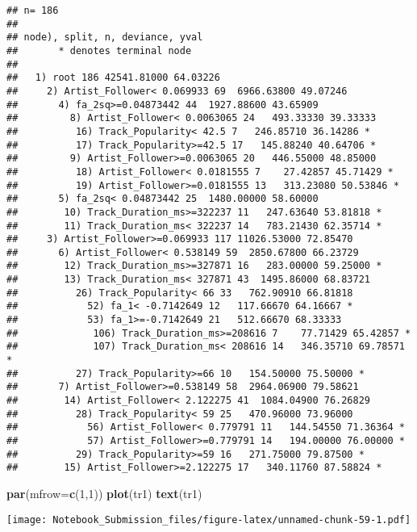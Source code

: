 \documentclass[
]{article}
\newenvironment{Shaded}{\begin{snugshade}}{\end{snugshade}}
\newcommand{\DataTypeTok}[1]{\textcolor[rgb]{0.13,0.29,0.53}{#1}}
\newcommand{\DecValTok}[1]{\textcolor[rgb]{0.00,0.00,0.81}{#1}}
\newcommand{\KeywordTok}[1]{\textcolor[rgb]{0.13,0.29,0.53}{\textbf{#1}}}
\newcommand{\NormalTok}[1]{#1}
\begin{document}
\begin{verbatim}
## n= 186 
## 
## node), split, n, deviance, yval
##       * denotes terminal node
## 
##   1) root 186 42541.81000 64.03226  
##     2) Artist_Follower< 0.069933 69  6966.63800 49.07246  
##       4) fa_2sq>=0.04873442 44  1927.88600 43.65909  
##         8) Artist_Follower< 0.0063065 24   493.33330 39.33333  
##          16) Track_Popularity< 42.5 7   246.85710 36.14286 *
##          17) Track_Popularity>=42.5 17   145.88240 40.64706 *
##         9) Artist_Follower>=0.0063065 20   446.55000 48.85000  
##          18) Artist_Follower< 0.0181555 7    27.42857 45.71429 *
##          19) Artist_Follower>=0.0181555 13   313.23080 50.53846 *
##       5) fa_2sq< 0.04873442 25  1480.00000 58.60000  
##        10) Track_Duration_ms>=322237 11   247.63640 53.81818 *
##        11) Track_Duration_ms< 322237 14   783.21430 62.35714 *
##     3) Artist_Follower>=0.069933 117 11026.53000 72.85470  
##       6) Artist_Follower< 0.538149 59  2850.67800 66.23729  
##        12) Track_Duration_ms>=327871 16   283.00000 59.25000 *
##        13) Track_Duration_ms< 327871 43  1495.86000 68.83721  
##          26) Track_Popularity< 66 33   762.90910 66.81818  
##            52) fa_1< -0.7142649 12   117.66670 64.16667 *
##            53) fa_1>=-0.7142649 21   512.66670 68.33333  
##             106) Track_Duration_ms>=208616 7    77.71429 65.42857 *
##             107) Track_Duration_ms< 208616 14   346.35710 69.78571 *
##          27) Track_Popularity>=66 10   154.50000 75.50000 *
##       7) Artist_Follower>=0.538149 58  2964.06900 79.58621  
##        14) Artist_Follower< 2.122275 41  1084.04900 76.26829  
##          28) Track_Popularity< 59 25   470.96000 73.96000  
##            56) Artist_Follower< 0.779791 11   144.54550 71.36364 *
##            57) Artist_Follower>=0.779791 14   194.00000 76.00000 *
##          29) Track_Popularity>=59 16   271.75000 79.87500 *
##        15) Artist_Follower>=2.122275 17   340.11760 87.58824 *
\end{verbatim}

\begin{Shaded}
\begin{Highlighting}[]
\KeywordTok{par}\NormalTok{(}\DataTypeTok{mfrow=}\KeywordTok{c}\NormalTok{(}\DecValTok{1}\NormalTok{,}\DecValTok{1}\NormalTok{))}
\KeywordTok{plot}\NormalTok{(tr1)}
\KeywordTok{text}\NormalTok{(tr1)}
\end{Highlighting}
\end{Shaded}

\texttt{[image: Notebook\_Submission\_files/figure-latex/unnamed-chunk-59-1.pdf]}
\end{document}
